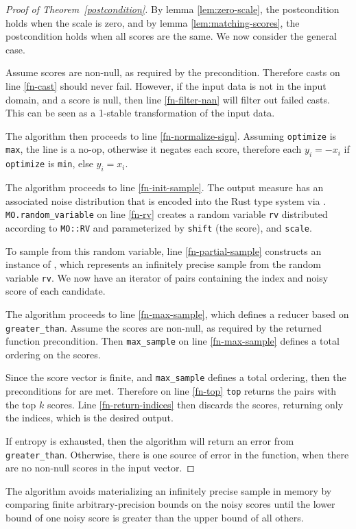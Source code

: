 \documentclass{article}
\begin{document}
\begin{proof}[Proof of Theorem~\ref{postcondition}]
    By lemma \ref{lem:zero-scale}, the postcondition holds when the scale is zero,
    and by lemma \ref{lem:matching-scores}, the postcondition holds when all scores are the same.
    We now consider the general case.

    Assume scores are non-null, as required by the precondition.
    Therefore casts on line \ref{fn-cast} should never fail.
    However, if the input data is not in the input domain, and a score is null,
    then line \ref{fn-filter-nan} will filter out failed casts.
    This can be seen as a 1-stable transformation of the input data.

    The algorithm then proceeds to line \ref{fn-normalize-sign}.
    Assuming \texttt{optimize} is \texttt{max}, the line is a no-op, otherwise it negates each score,
    therefore each $y_i = -x_i$ if \texttt{optimize} is \texttt{min}, else $y_i = x_i$.

    The algorithm proceeds to line \ref{fn-init-sample}.
    The output measure has an associated noise distribution that is encoded into the Rust type system via
    .
    \texttt{MO.random\_variable} on line \ref{fn-rv} creates a random variable \texttt{rv} 
    distributed according to \texttt{MO::RV} and parameterized by \texttt{shift} (the score), and \texttt{scale}.

    To sample from this random variable, line \ref{fn-partial-sample} constructs an instance of 
    , 
    which represents an infinitely precise sample from the random variable \texttt{rv}.
    We now have an iterator of pairs containing the index and noisy score of each candidate.

    The algorithm proceeds to line \ref{fn-max-sample},
    which defines a reducer based on \texttt{greater\_than}.
    Assume the scores are non-null, as required by the returned function precondition.
    Then \texttt{max\_sample} on line \ref{fn-max-sample} defines a total ordering on the scores.

    Since the score vector is finite, and \texttt{max\_sample} defines a total ordering,
    then the preconditions for  are met.
    Therefore on line \ref{fn-top} \texttt{top} returns the pairs with the top $k$ scores.
    Line \ref{fn-return-indices} then discards the scores, returning only the indices,
    which is the desired output.

    If entropy is exhausted, then the algorithm will return an error from \texttt{greater\_than}.
    Otherwise, there is one source of error in the function,
    when there are no non-null scores in the input vector.
\end{proof}

The algorithm avoids materializing an infinitely precise sample in memory by comparing finite arbitrary-precision bounds 
on the noisy scores until the lower bound of one noisy score is greater than the upper bound of all others.
\end{document}

